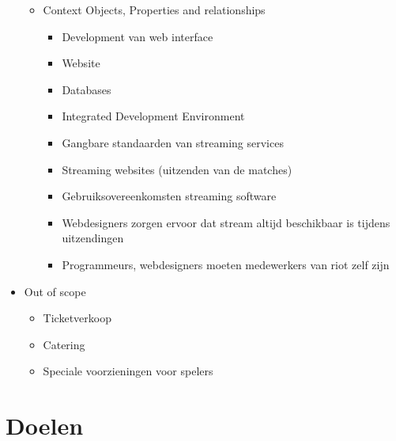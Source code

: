 \documentclass[12pt,a4paper]{article}
\begin{document}
\begin{itemize}
\begin{itemize}
\begin{itemize}
				\end{itemize}
				\item Context Objects, Properties and relationships
				\begin{itemize}
					\item Development van web interface
					\item Website
					\item Databases
					\item Integrated Development Environment
					\item Gangbare standaarden van streaming services
					\item Streaming websites (uitzenden van de matches)
					\item Gebruiksovereenkomsten streaming software
					\item Webdesigners zorgen ervoor dat stream altijd beschikbaar is tijdens uitzendingen
					\item Programmeurs, webdesigners moeten medewerkers van riot zelf zijn
				\end{itemize}
			\end{itemize}
			\item Out of scope
			\begin{itemize}
				\item Ticketverkoop
				\item Catering
				\item Speciale voorzieningen voor spelers
			\end{itemize}
		\end{itemize}
		\newpage
		\section{Doelen}
\end{document}
